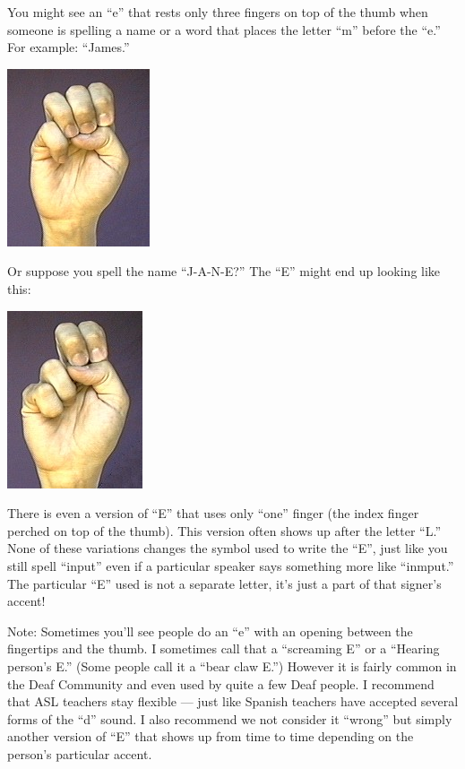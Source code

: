 \documentclass{article}
\begin{document}
You might see an ``e'' that rests only three fingers on top of the thumb when someone is spelling a name or a word that places the letter ``m'' before the ``e.''
For example: ``James.''

\includegraphics[scale=0.5]{images/e3.jpg}

Or suppose you spell the name ``J-A-N-E?''
The ``E'' might end up looking like this:

\includegraphics[scale=0.5]{images/e2.jpg}

There is even a version of ``E'' that uses only ``one'' finger (the index finger perched on top of the thumb).
This version often shows up after the letter ``L.''
None of these variations changes the symbol used to write the ``E'', just like you still spell ``input'' even if a particular speaker says something more like ``i{\footnotesize nm}put.''
The particular ``E'' used is not a separate letter, it's just a part of that signer's accent!

Note:
Sometimes you'll see people do an ``e'' with an opening between the fingertips and the thumb.
I sometimes call that a ``screaming E'' or a ``Hearing person's E.''
(Some people call it a ``bear claw E.'')
However it is fairly common in the Deaf Community and even used by quite a few Deaf people.
I recommend that ASL teachers stay flexible --- just like Spanish teachers have accepted several forms of the ``d'' sound.
I also recommend we not consider it ``wrong'' but simply another version of ``E'' that shows up from time to time depending on the person's particular accent. 
\end{document}
